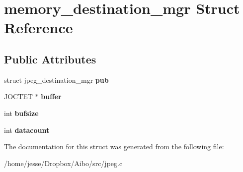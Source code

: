 \hypertarget{structmemory__destination__mgr}{
\section{memory\_\-destination\_\-mgr Struct Reference}
\label{structmemory__destination__mgr}
}
\subsection*{Public Attributes}
\begin{DoxyCompactItemize}
\item 
\hypertarget{structmemory__destination__mgr_af8c2560ac94ef09532ff72404675d5d9}{
struct jpeg\_\-destination\_\-mgr {\bfseries pub}}
\label{structmemory__destination__mgr_af8c2560ac94ef09532ff72404675d5d9}

\item 
\hypertarget{structmemory__destination__mgr_a43da4fbb66aef931f8994e1e1173a314}{
JOCTET $\ast$ {\bfseries buffer}}
\label{structmemory__destination__mgr_a43da4fbb66aef931f8994e1e1173a314}

\item 
\hypertarget{structmemory__destination__mgr_a613e5a9e69ca6a498e687d33799e97e2}{
int {\bfseries bufsize}}
\label{structmemory__destination__mgr_a613e5a9e69ca6a498e687d33799e97e2}

\item 
\hypertarget{structmemory__destination__mgr_add951d03e7911d49dbe092f25f7fcf3f}{
int {\bfseries datacount}}
\label{structmemory__destination__mgr_add951d03e7911d49dbe092f25f7fcf3f}

\end{DoxyCompactItemize}


The documentation for this struct was generated from the following file:\begin{DoxyCompactItemize}
\item 
/home/jesse/Dropbox/Aibo/src/jpeg.c\end{DoxyCompactItemize}
